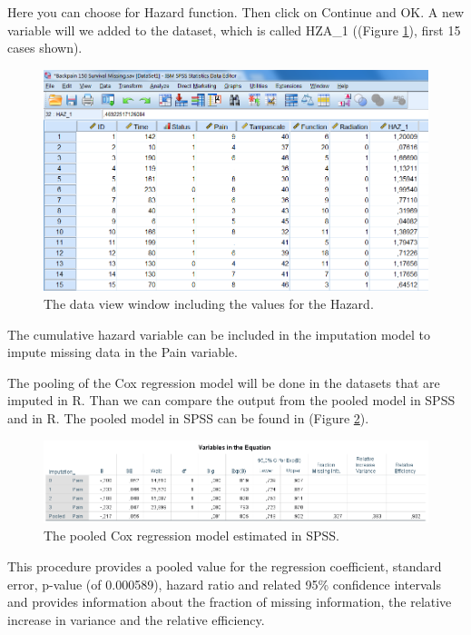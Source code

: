 \documentclass[]{book}
\theoremstyle{definition}
\theoremstyle{definition}
\theoremstyle{definition}
\theoremstyle{remark}
\begin{document}
Here you can choose for Hazard function. Then click on Continue and OK.
A new variable will we added to the dataset, which is called HZA\_1
((Figure \ref{fig:fig5-7}), first 15 cases shown).

\begin{figure}

{\centering \includegraphics[width=0.9\linewidth]{images/fig5.7} 

}

\caption{The data view window including the values for the Hazard.}\label{fig:fig5-7}
\end{figure}

The cumulative hazard variable can be included in the imputation model
to impute missing data in the Pain variable.

The pooling of the Cox regression model will be done in the datasets
that are imputed in R. Than we can compare the output from the pooled
model in SPSS and in R. The pooled model in SPSS can be found in (Figure
\ref{fig:tab5-10}).

\begin{figure}

{\centering \includegraphics[width=0.9\linewidth]{images/table5.10} 

}

\caption{The pooled Cox regression model estimated in SPSS.}\label{fig:tab5-10}
\end{figure}

This procedure provides a pooled value for the regression coefficient,
standard error, p-value (of 0.000589), hazard ratio and related 95\%
confidence intervals and provides information about the fraction of
missing information, the relative increase in variance and the relative
efficiency.
\end{document}
